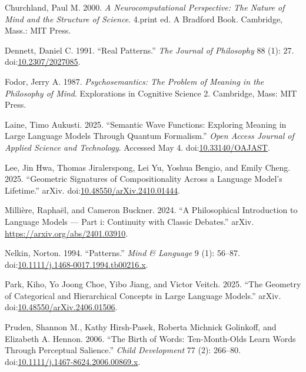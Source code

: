 \documentclass[12pt]{article}
\newlength{\cslhangindent}
\newenvironment{CSLReferences}[2]%
  {\begin{enumerate}[label={[\arabic*]},leftmargin=\cslhangindent,itemsep=0pt]%
   \raggedright\sloppy}%
  {\end{enumerate}}
\begin{document}
\protect{}\label{refs}
\begin{CSLReferences}{1}{0}
Churchland, Paul M. 2000. \emph{A Neurocomputational Perspective: The Nature of Mind and the Structure of Science}. 4.print ed. A Bradford Book. Cambridge, Mass.: MIT Press.

Dennett, Daniel C. 1991. {``Real Patterns.''} \emph{The Journal of Philosophy} 88 (1): 27. doi:\href{https://doi.org/10.2307/2027085}{10.2307/2027085}.

Fodor, Jerry A. 1987. \emph{Psychosemantics: The Problem of Meaning in the Philosophy of Mind}. Explorations in Cognitive Science 2. Cambridge, Mass: MIT Press.

Laine, Timo Aukusti. 2025. {``Semantic Wave Functions: Exploring Meaning in Large Language Models Through Quantum Formalism.''} \emph{Open Access Journal of Applied Science and Technology}. Accessed May 4. doi:\href{https://doi.org/10.33140/OAJAST}{10.33140/OAJAST}.

Lee, Jin Hwa, Thomas Jiralerspong, Lei Yu, Yoshua Bengio, and Emily Cheng. 2025. {``Geometric Signatures of Compositionality Across a Language Model's Lifetime.''} arXiv. doi:\href{https://doi.org/10.48550/arXiv.2410.01444}{10.48550/arXiv.2410.01444}.

Millière, Raphaël, and Cameron Buckner. 2024. {``A Philosophical Introduction to Language Models --- Part i: Continuity with Classic Debates.''} arXiv. \url{https://arxiv.org/abs/2401.03910}.

Nelkin, Norton. 1994. {``Patterns.''} \emph{Mind \& Language} 9 (1): 56--87. doi:\href{https://doi.org/10.1111/j.1468-0017.1994.tb00216.x}{10.1111/j.1468-0017.1994.tb00216.x}.

Park, Kiho, Yo Joong Choe, Yibo Jiang, and Victor Veitch. 2025. {``The Geometry of Categorical and Hierarchical Concepts in Large Language Models.''} arXiv. doi:\href{https://doi.org/10.48550/arXiv.2406.01506}{10.48550/arXiv.2406.01506}.

Pruden, Shannon M., Kathy Hirsh-Pasek, Roberta Michnick Golinkoff, and Elizabeth A. Hennon. 2006. {``The Birth of Words: Ten-Month-Olds Learn Words Through Perceptual Salience.''} \emph{Child Development} 77 (2): 266--80. doi:\href{https://doi.org/10.1111/j.1467-8624.2006.00869.x}{10.1111/j.1467-8624.2006.00869.x}.


\end{CSLReferences}
\end{document}
